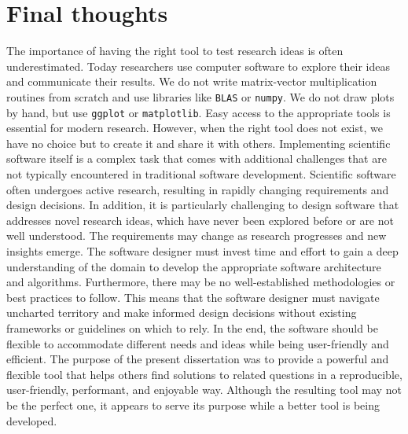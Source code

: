 \section{Final thoughts}\label{chapter-06:section:outline}


The importance of having the right tool to test research ideas is often underestimated.
Today researchers use computer software to explore their ideas and communicate their results.
We do not write matrix-vector multiplication routines from scratch and use libraries like
\texttt{BLAS} or \texttt{numpy}. 
We do not draw plots by hand, but use \texttt{ggplot} or \texttt{matplotlib}.
Easy access to the appropriate tools is essential for modern research.
However, when the right tool does not exist, we have no choice but to create it and share it with others. 
Implementing scientific software itself is a complex task that comes with additional
challenges that are not typically encountered in traditional software development.
Scientific software often undergoes active research, resulting in rapidly changing
requirements and design decisions.
In addition, it is particularly challenging to design software that addresses novel research ideas, which have never been explored before or are not well understood.
The requirements may change as research progresses and new insights emerge.
The software designer must invest time and effort to gain a deep understanding of the
domain to develop the appropriate software architecture and algorithms.
Furthermore, there may be no well-established methodologies or best practices to follow.
This means that the software designer must navigate uncharted territory and make informed
design decisions without existing frameworks or guidelines on which to rely.
In the end, the software should be flexible to accommodate different needs and ideas while being 
user-friendly and efficient.
The purpose of the present dissertation was to provide a powerful and flexible tool that helps others find solutions to related questions in a reproducible, user-friendly, performant, and enjoyable way.
Although the resulting tool may not be the perfect one, it appears to serve its purpose while a better tool is
being developed. 
